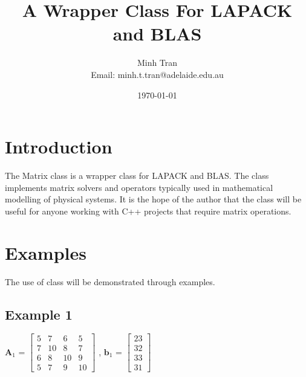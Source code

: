 \documentclass[a4paper]{article}
\begin{document}
\title{\Huge A Wrapper Class For LAPACK and BLAS }
\date{\today}
\author{Minh Tran\\Email: minh.t.tran@adelaide.edu.au}
\maketitle

 



\section{Introduction} \label{Introduction}
The Matrix class is a wrapper class for LAPACK and BLAS. The class implements matrix solvers and operators typically used in mathematical modelling of physical systems. It is the hope of the author that the class will be useful for anyone working with C++ projects that require matrix operations.



\section{Examples} \label{Examples}
The use of class will be demonstrated through examples.


 


\subsection{Example 1}
 

 
$\boldsymbol{A}_{1}$ = $\begin{bmatrix}
5 &  7 &  6 & 5 \\
7 & 10 &  8 & 7 \\
6 &  8 & 10 & 9 \\
5 &  7 &  9 & 10 
 \end{bmatrix}$ \hspace{0.5cm} , \hspace{0.5cm} 
$\boldsymbol{b}_{1}$ = $\begin{bmatrix}
23 \\ 
32 \\
33 \\
31 
\end{bmatrix}$

\vspace{0.5cm}
\end{document}
